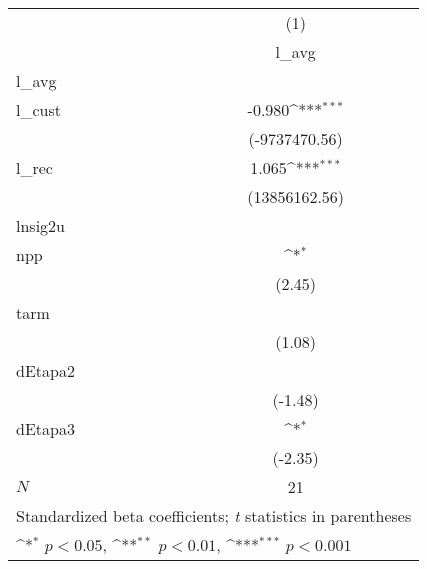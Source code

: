 {
\def\sym#1{\ifmmode^{#1}\else\(^{#1}\)\fi}
\begin{tabular}{l*{1}{c}}
\hline\hline
            &\multicolumn{1}{c}{(1)}\\
            &\multicolumn{1}{c}{l\_avg}\\
\hline
l\_avg       &                     \\
l\_cust      &      -0.980\sym{***}\\
            &(-9737470.56)         \\
[1em]
l\_rec       &       1.065\sym{***}\\
            &(13856162.56)         \\
\hline
lnsig2u     &                     \\
npp         &            \sym{*}  \\
            &      (2.45)         \\
[1em]
tarm        &                     \\
            &      (1.08)         \\
[1em]
dEtapa2     &                     \\
            &     (-1.48)         \\
[1em]
dEtapa3     &            \sym{*}  \\
            &     (-2.35)         \\
\hline
\(N\)       &          21         \\
\hline\hline
\multicolumn{2}{l}{\footnotesize Standardized beta coefficients; \textit{t} statistics in parentheses}\\
\multicolumn{2}{l}{\footnotesize \sym{*} \(p<0.05\), \sym{**} \(p<0.01\), \sym{***} \(p<0.001\)}\\
\end{tabular}
}
